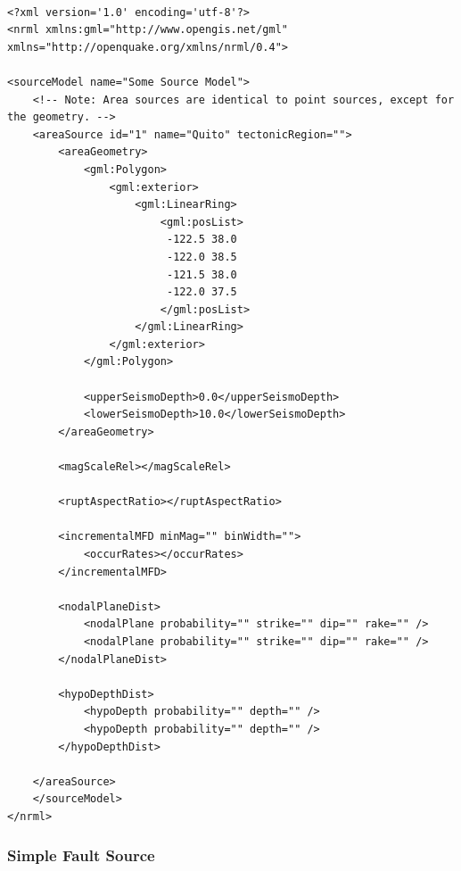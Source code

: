 \begin{Verbatim}[frame=single, commandchars=\\\{\}, fontsize=\scriptsize, samepage=true]

<?xml version='1.0' encoding='utf-8'?>
<nrml xmlns:gml="http://www.opengis.net/gml" xmlns="http://openquake.org/xmlns/nrml/0.4">

<sourceModel name="Some Source Model">
    <!-- Note: Area sources are identical to point sources, except for the geometry. -->
    <areaSource id="1" name="Quito" tectonicRegion="">
        <areaGeometry>
            <gml:Polygon>
                <gml:exterior>
                    <gml:LinearRing>
                        <gml:posList>
                         -122.5 38.0
                         -122.0 38.5
                         -121.5 38.0
                         -122.0 37.5
                        </gml:posList>
                    </gml:LinearRing>
                </gml:exterior>
            </gml:Polygon>

            <upperSeismoDepth>0.0</upperSeismoDepth>
            <lowerSeismoDepth>10.0</lowerSeismoDepth>
        </areaGeometry>

        <magScaleRel></magScaleRel>

        <ruptAspectRatio></ruptAspectRatio>

        <incrementalMFD minMag="" binWidth="">
            <occurRates></occurRates>
        </incrementalMFD>

        <nodalPlaneDist>
            <nodalPlane probability="" strike="" dip="" rake="" />
            <nodalPlane probability="" strike="" dip="" rake="" />
        </nodalPlaneDist>

        <hypoDepthDist>
            <hypoDepth probability="" depth="" />
            <hypoDepth probability="" depth="" />
        </hypoDepthDist>

    </areaSource>
    </sourceModel>
</nrml>

\end{Verbatim}

\subsubsection{Simple Fault Source}

